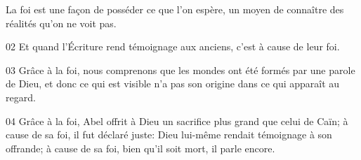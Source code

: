 La foi est une façon de posséder ce que l’on espère, un moyen de connaître des réalités qu’on ne voit pas.

02 Et quand l’Écriture rend témoignage aux anciens, c’est à cause de leur foi.

03 Grâce à la foi, nous comprenons que les mondes ont été formés par une parole de Dieu, et donc ce qui est visible n’a pas son origine dans ce qui apparaît au regard.

04 Grâce à la foi, Abel offrit à Dieu un sacrifice plus grand que celui de Caïn; à cause de sa foi, il fut déclaré juste: Dieu lui-même rendait témoignage à son offrande; à cause de sa foi, bien qu’il soit mort, il parle encore.
